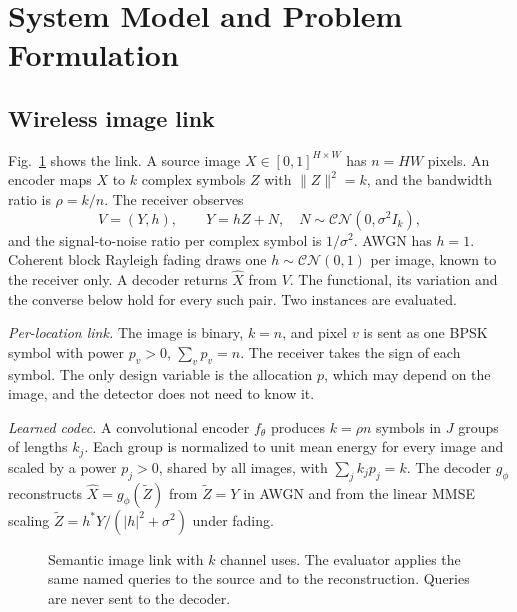 \documentclass[10pt,conference]{IEEEtran}
\begin{document}
\section{System Model and Problem Formulation}
\subsection{Wireless image link}
Fig.~\ref{fig:system} shows the link. A source image $X\in[0,1]^{H\times W}$ has $n=HW$ pixels. An encoder maps $X$ to $k$ complex symbols $Z$ with $\|Z\|^2=k$, and the bandwidth ratio is $\rho=k/n$. The receiver observes
\begin{equation}
 V=(Y,h),\qquad Y=hZ+N,\quad N\sim\mathcal{CN}(0,\sigma^2I_k),
\end{equation}
and the signal-to-noise ratio per complex symbol is $1/\sigma^2$. AWGN has $h=1$. Coherent block Rayleigh fading draws one $h\sim\mathcal{CN}(0,1)$ per image, known to the receiver only. A decoder returns $\hat X$ from $V$. The functional, its variation and the converse below hold for every such pair. Two instances are evaluated.

\emph{Per-location link.} The image is binary, $k=n$, and pixel $v$ is sent as one BPSK symbol with power $p_v>0$, $\sum_vp_v=n$. The receiver takes the sign of each symbol. The only design variable is the allocation $p$, which may depend on the image, and the detector does not need to know it.

\emph{Learned codec.} A convolutional encoder $f_\theta$ produces $k=\rho n$ symbols in $J$ groups of lengths $k_j$. Each group is normalized to unit mean energy for every image and scaled by a power $p_j>0$, shared by all images, with $\sum_jk_jp_j=k$. The decoder $g_\phi$ reconstructs $\hat X=g_\phi(\tilde Z)$ from $\tilde Z=Y$ in AWGN and from the linear MMSE scaling $\tilde Z=h^*Y/(|h|^2+\sigma^2)$ under fading.
\begin{figure}[t]\centering
{}
\caption{Semantic image link with $k$ channel uses. The evaluator applies the same named queries to the source and to the reconstruction. Queries are never sent to the decoder.}
\label{fig:system}\end{figure}
\end{document}
